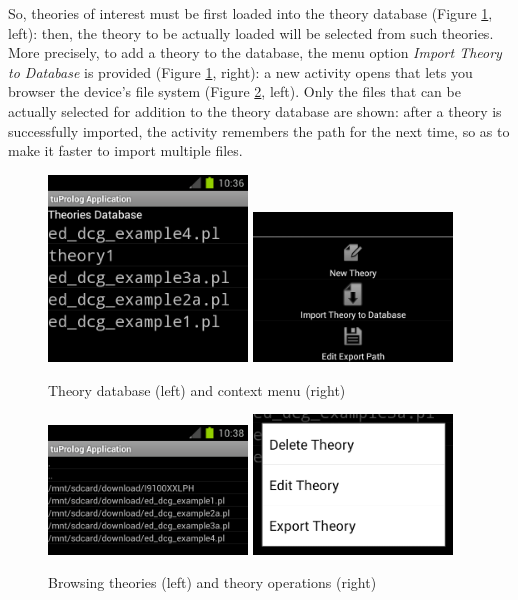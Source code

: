 So, theories of interest must be first loaded into the theory database (Figure \ref{fig:android34}, left): then, the theory to be actually loaded will be selected from such theories.
%
More precisely, to add a theory to the database, the menu option \textit{Import Theory to Database} is provided (Figure \ref{fig:android34}, right): a new activity opens that lets you browser the device's file system (Figure \ref{fig:android56}, left). Only the files that can be actually selected for addition to the theory database are shown: after a theory is successfully imported, the activity remembers the path for the next time, so as to make it faster to import multiple files.

\begin{figure}
  \includegraphics[width=200px]{images/android3.png}
  \includegraphics[width=200px]{images/android4.png}
  \caption{Theory database (left) and context menu (right)}\label{fig:android34}
\end{figure}

\begin{figure}
  \includegraphics[width=200px]{images/android6.png}
  \includegraphics[width=200px]{images/android5.png}
  \caption{Browsing theories (left) and theory operations (right)}\label{fig:android56}
\end{figure}

